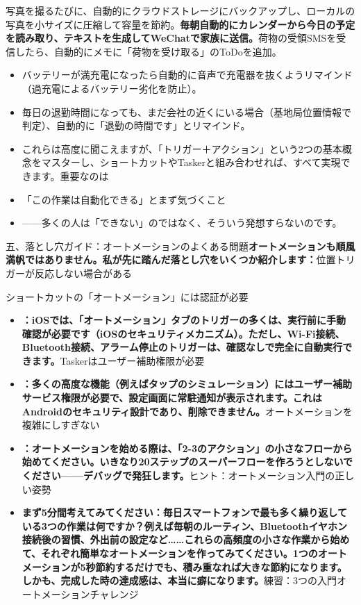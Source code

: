 写真を撮るたびに、自動的にクラウドストレージにバックアップし、ローカルの写真を小サイズに圧縮して容量を節約。\textbf{毎朝自動的にカレンダーから今日の予定を読み取り、テキストを生成してWeChatで家族に送信。}荷物の受領SMSを受信したら、自動的にメモに「荷物を受け取る」のToDoを追加。

\begin{itemize}
  \item バッテリーが満充電になったら自動的に音声で充電器を抜くようリマインド（過充電によるバッテリー劣化を防止）。
  \item 毎日の退勤時間になっても、まだ会社の近くにいる場合（基地局位置情報で判定）、自動的に「退勤の時間です」とリマインド。
  \item これらは高度に聞こえますが、「トリガー＋アクション」という2つの基本概念をマスターし、ショートカットやTaskerと組み合わせれば、すべて実現できます。重要なのは
  \item 「この作業は自動化できる」とまず気づくこと
  \item ——多くの人は「できない」のではなく、そういう発想すらないのです。
\end{itemize}

五、落とし穴ガイド：オートメーションのよくある問題\textbf{オートメーションも順風満帆ではありません。私が先に踏んだ落とし穴をいくつか紹介します：}位置トリガーが反応しない場合がある


ショートカットの「オートメーション」には認証が必要

\begin{itemize}
  \item \textbf{：iOSでは、「オートメーション」タブのトリガーの多くは、実行前に手動確認が必要です（iOSのセキュリティメカニズム）。ただし、Wi-Fi接続、Bluetooth接続、アラーム停止のトリガーは、確認なしで完全に自動実行できます。}Taskerはユーザー補助権限が必要
  \item \textbf{：多くの高度な機能（例えばタップのシミュレーション）にはユーザー補助サービス権限が必要で、設定画面に常駐通知が表示されます。これはAndroidのセキュリティ設計であり、削除できません。}オートメーションを複雑にしすぎない
  \item \textbf{：オートメーションを始める際は、「2-3のアクション」の小さなフローから始めてください。いきなり20ステップのスーパーフローを作ろうとしないでください——デバッグで発狂します。}ヒント：オートメーション入門の正しい姿勢
  \item \textbf{まず5分間考えてみてください：毎日スマートフォンで最も多く繰り返している3つの作業は何ですか？例えば毎朝のルーティン、Bluetoothイヤホン接続後の習慣、外出前の設定など……これらの高頻度の小さな作業から始めて、それぞれ簡単なオートメーションを作ってみてください。1つのオートメーションが5秒節約するだけでも、積み重なれば大きな節約になります。しかも、完成した時の達成感は、本当に癖になります。}練習：3つの入門オートメーションチャレンジ
\end{itemize}

